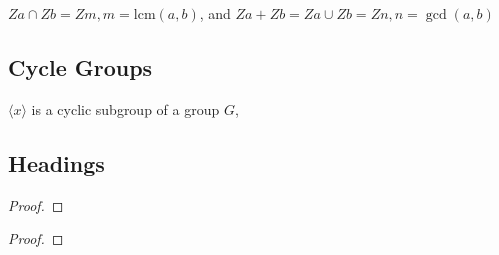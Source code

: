 \documentclass{tufte-handout}
\begin{document}
$Za\cap Zb=Zm, m=\mathrm{lcm}(a, b)$, and $Za + Zb=Za\cup Zb=Zn, n = \gcd(a, b)$

\subsection{Cycle Groups}

$\langle x \rangle$ is a cyclic subgroup of a group $G$,

\subsection{Headings}\label{sec:headings}
\begin{theorem}%
	\lipsum[1][1-3] %
\end{theorem}

\begin{lemma}%
	\lipsum[1][1-3] %
	
\end{lemma}
\begin{proof}
	\lipsum[1][1-5]
\end{proof}


\begin{corollary}%
	\lipsum[1][1-3] %
\end{corollary}

\begin{proposition}
	\lipsum[1][1-3] %
\end{proposition}
\begin{problem}
	\lipsum[1][1-2]
\end{problem}

\begin{proof}
	\lipsum*[1]
\end{proof}
\end{document}
